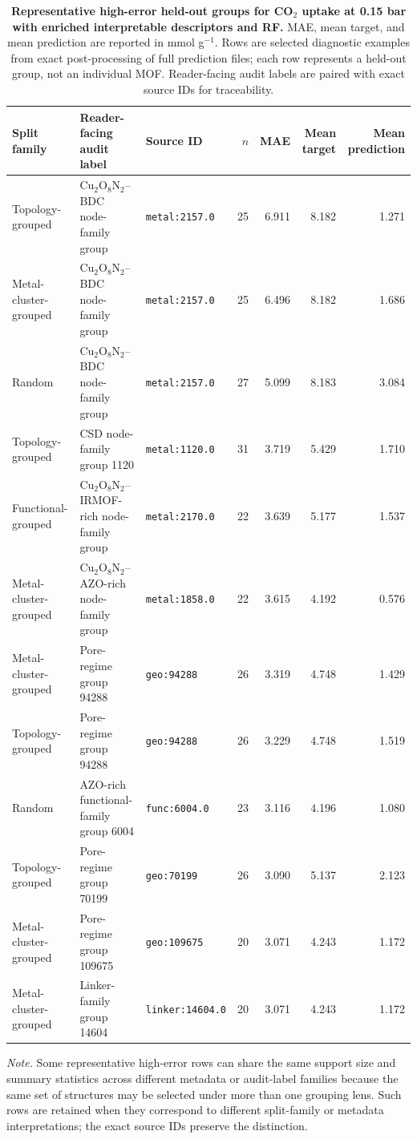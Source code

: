 \documentclass[11pt,a4paper]{article}
\begin{document}
\begin{table}[H]
\centering
\caption{\textbf{Representative high-error held-out groups for CO$_2$ uptake at 0.15 bar with enriched interpretable descriptors and RF.}
MAE, mean target, and mean prediction are reported in mmol g$^{-1}$. Rows are selected diagnostic
examples from exact post-processing of full prediction files; each row represents a held-out group, not an individual MOF. Reader-facing audit labels are paired with exact source IDs for traceability.}
\label{tab:si_hard_groups}
\scriptsize
\setlength{\tabcolsep}{3pt}
\begin{tabular}{p{}p{}p{}rrrr}
\toprule
Split family & Reader-facing audit label & Source ID & $n$ & MAE & Mean target & Mean prediction \\
\midrule
Topology-grouped & Cu$_2$O$_8$N$_2$--BDC node-family group & \texttt{metal:2157.0} & 25 & 6.911 & 8.182 & 1.271 \\
Metal-cluster-grouped & Cu$_2$O$_8$N$_2$--BDC node-family group & \texttt{metal:2157.0} & 25 & 6.496 & 8.182 & 1.686 \\
Random & Cu$_2$O$_8$N$_2$--BDC node-family group & \texttt{metal:2157.0} & 27 & 5.099 & 8.183 & 3.084 \\
Topology-grouped & CSD node-family group 1120 & \texttt{metal:1120.0} & 31 & 3.719 & 5.429 & 1.710 \\
Functional-grouped & Cu$_2$O$_8$N$_2$--IRMOF-rich node-family group & \texttt{metal:2170.0} & 22 & 3.639 & 5.177 & 1.537 \\
Metal-cluster-grouped & Cu$_2$O$_8$N$_2$--AZO-rich node-family group & \texttt{metal:1858.0} & 22 & 3.615 & 4.192 & 0.576 \\
Metal-cluster-grouped & Pore-regime group 94288 & \texttt{geo:94288} & 26 & 3.319 & 4.748 & 1.429 \\
Topology-grouped & Pore-regime group 94288 & \texttt{geo:94288} & 26 & 3.229 & 4.748 & 1.519 \\
Random & AZO-rich functional-family group 6004 & \texttt{func:6004.0} & 23 & 3.116 & 4.196 & 1.080 \\
Topology-grouped & Pore-regime group 70199 & \texttt{geo:70199} & 26 & 3.090 & 5.137 & 2.123 \\
Metal-cluster-grouped & Pore-regime group 109675 & \texttt{geo:109675} & 20 & 3.071 & 4.243 & 1.172 \\
Metal-cluster-grouped & Linker-family group 14604 & \texttt{linker:14604.0} & 20 & 3.071 & 4.243 & 1.172 \\
\bottomrule
\end{tabular}
\end{table}
\noindent\textit{Note.} Some representative high-error rows can share the same support size and summary statistics across different metadata or audit-label families because the same set of structures may be selected under more than one grouping lens. Such rows are retained when they correspond to different split-family or metadata interpretations; the exact source IDs preserve the distinction.
\end{document}
